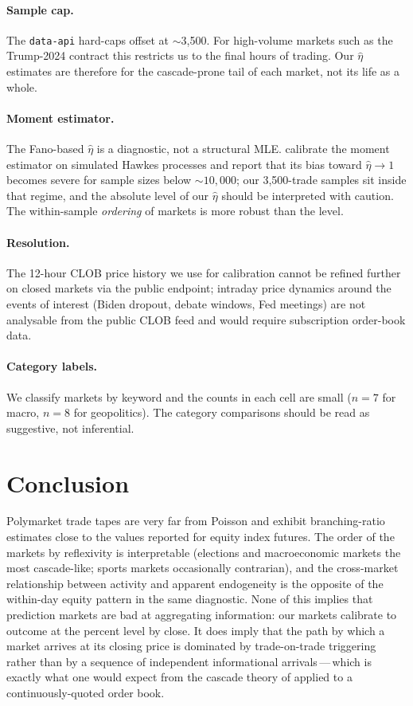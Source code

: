 \documentclass{article}
\begin{document}
\paragraph{Sample cap.} The \texttt{data-api} hard-caps offset at
$\sim$3,500. For high-volume markets such as the Trump-2024 contract
this restricts us to the final hours of trading. Our $\hat\eta$
estimates are therefore for the cascade-prone tail of each market,
not its life as a whole.

\paragraph{Moment estimator.} The Fano-based $\hat\eta$ is a
diagnostic, not a structural MLE. \citet{hardiman2013critical}
calibrate the moment estimator on simulated Hawkes processes and
report that its bias toward $\hat\eta\to 1$ becomes severe for
sample sizes below $\sim 10{,}000$; our 3,500-trade samples sit
inside that regime, and the absolute level of our $\hat\eta$ should be
interpreted with caution. The within-sample \emph{ordering} of
markets is more robust than the level.

\paragraph{Resolution.} The 12-hour CLOB price history we use for
calibration cannot be refined further on closed markets via the public
endpoint; intraday price dynamics around the events of interest
(Biden dropout, debate windows, Fed meetings) are not analysable from
the public CLOB feed and would require subscription
order-book data.

\paragraph{Category labels.} We classify markets by keyword and the
counts in each cell are small ($n\!=\!7$ for macro, $n\!=\!8$ for
geopolitics). The category comparisons should be read as suggestive,
not inferential.

\section{Conclusion}

Polymarket trade tapes are very far from Poisson and exhibit
branching-ratio estimates close to the values reported for equity
index futures. The order of the markets by reflexivity is interpretable
(elections and macroeconomic markets the most cascade-like; sports
markets occasionally contrarian), and the cross-market relationship
between activity and apparent endogeneity is the opposite of the
within-day equity pattern in the same diagnostic. None of this implies
that prediction markets are bad at aggregating information: our
markets calibrate to outcome at the percent level by close. It does
imply that the path by which a market arrives at its closing price is
dominated by trade-on-trade triggering rather than by a sequence of
independent informational arrivals\,---\,which is exactly what one
would expect from the cascade theory of
\citet{bikhchandani1992theory} applied to a continuously-quoted
order book.
\end{document}
